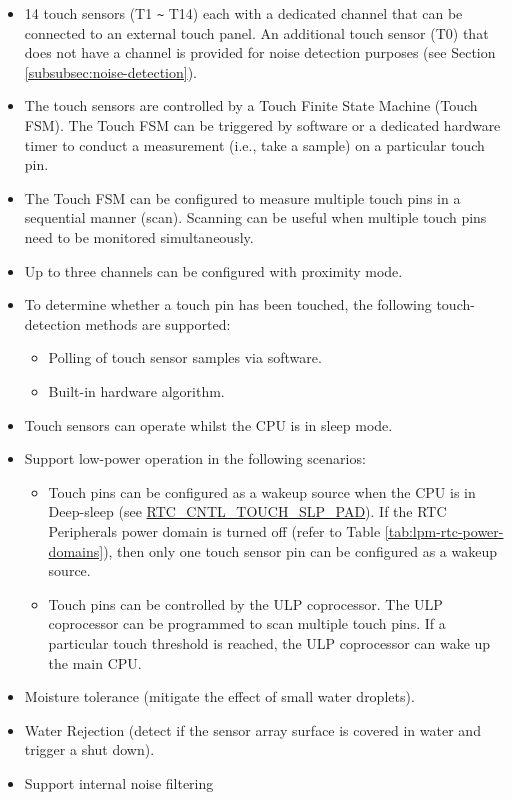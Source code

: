 \documentclass[main\_\_EN.tex]{subfiles}
\begin{document}
\begin{itemize}
\item 14 touch sensors (T1 \verb+~+ T14) each with a dedicated channel that can be connected to an external touch panel. An additional touch sensor (T0) that does not have a channel is provided for noise detection purposes (see Section \ref{subsubsec:noise-detection}).
    \item The touch sensors are controlled by a Touch Finite State Machine (Touch FSM). The Touch FSM can be triggered by software or a dedicated hardware timer to conduct a measurement (i.e., take a sample) on a particular touch pin.
    \item The Touch FSM can be configured to measure multiple touch pins in a sequential manner (scan). Scanning can be useful when multiple touch pins need to be monitored simultaneously.
    \item Up to three channels can be configured with proximity mode.
    \item To determine whether a touch pin has been touched, the following touch-detection methods are supported:
    \begin{itemize}
        \item Polling of touch sensor samples via software.
        \item Built-in hardware algorithm.
    \end{itemize}
    \item Touch sensors can operate whilst the CPU is in sleep mode.
    \item Support \chipname{} low-power operation in the following scenarios:
    \begin{itemize}
        \item Touch pins can be configured as a wakeup source when the CPU is in Deep-sleep (see \hyperref[fielddesc:RTCCNTLTOUCHSLPPAD]{RTC\_CNTL\_TOUCH\_SLP\_PAD}). If the RTC Peripherals power domain is turned off (refer to Table \ref{tab:lpm-rtc-power-domains}), then only one touch sensor pin can be configured as a wakeup source.
        \item Touch pins can be controlled by the ULP coprocessor. The ULP coprocessor can be programmed to scan multiple touch pins. If a particular touch threshold is reached, the ULP coprocessor can wake up the main CPU.
    \end{itemize}
    \item Moisture tolerance (mitigate the effect of small water droplets).
    \item Water Rejection (detect if the sensor array surface is covered in water and trigger a shut down).
    \item Support internal noise filtering
\end{itemize}
\end{document}
